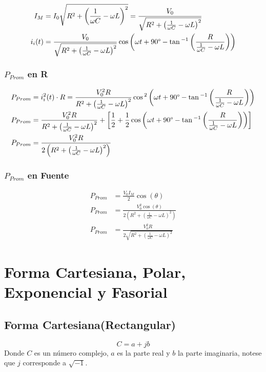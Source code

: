 \begin{align*}
  I_M &= I_0 \sqrt{R^2 + \left(\frac{1}{\omega C} - \omega L\right)^2} = \frac{V_0}{\sqrt{R^2 + \left(\frac{1}{\omega C} - \omega L\right)^2}}\\
  i_i(t) &= \frac{V_0}{\sqrt{R^2 + \left(\frac{1}{\omega C} - \omega L\right)^2}} \cos\left(\omega t + 90\degree - \tan{^{-1}}\left(\frac{R}{\frac{1}{\omega C} - \omega L}\right)\right)
\end{align*}

\subsection*{$P_{Prom}$  en R}

\begin{align*}
  P_{Prom} &= i_i^2(t) \cdot R = \frac{V_0^2 R}{R^2 + \left(\frac{1}{\omega C} - \omega L\right)^2} \cos{^2}\left(\omega t + 90\degree - \tan{^{-1}}\left(\frac{R}{\frac{1}{\omega C} - \omega L}\right)\right) \\
  P_{Prom} &= \frac{V_0^2 R}{R^2 + \left(\frac{1}{\omega C} - \omega L\right)^2} + \left[\frac{1}{2} + \frac{1}{2}\cos\left(\omega t + 90\degree - \tan{^{-1}}\left(\frac{R}{\frac{1}{\omega C} - \omega L}\right)\right)\right] \\
  P_{Prom} &= \frac{V_0^2 R}{2\left( R^2 + \left(\frac{1}{\omega C} - \omega L\right)^2\right)}
\end{align*}

\subsection*{$P_{Prom}$ en Fuente}

\begin{align*}
  P_{Prom} &= \frac{V_0 I_M}{2} \cos(\theta)\\
  P_{Prom} &= \frac{V_0^2 \cos(\theta)}{2\left( R^2 + \left(\frac{1}{\omega C} - \omega L\right)^2\right)}\\
  P_{Prom} &= \frac{V_0^2 R}{2\sqrt{R^2 + \left(\frac{1}{\omega C} - \omega L\right)^2}}
\end{align*}


\chapter{Forma Cartesiana, Polar, Exponencial y Fasorial}


\section*{Forma Cartesiana(Rectangular)}
\begin{equation*}
  C = a + j b
\end{equation*}
Donde $C$ es un número complejo, $a$ es la parte real y $b$ la parte imaginaria,
notese que $j$ corresponde a $\sqrt{-1}$.

